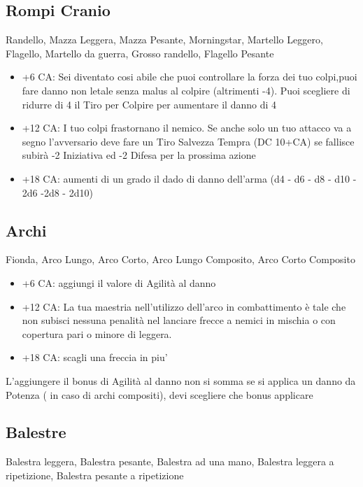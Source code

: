 \documentclass[a4paper,11pt,twoside,openany]{book}
\begin{document}
\subsection{Rompi Cranio} Randello, Mazza Leggera, Mazza Pesante, Morningstar,
Martello Leggero, Flagello, Martello da guerra, Grosso randello, Flagello Pesante

\begin{itemize}
	\item +6 CA: Sei diventato cosi abile che puoi controllare la forza dei tuo colpi,puoi fare danno non letale senza malus al colpire (altrimenti -4). Puoi scegliere di ridurre di 4 il Tiro per Colpire per aumentare il danno di 4

	\item +12 CA: I tuo colpi frastornano il nemico. Se anche solo un tuo attacco va a segno l'avversario deve fare un Tiro Salvezza Tempra (DC 10+CA) se fallisce subirà -2 Iniziativa ed -2 Difesa per la prossima azione

	\item +18 CA: aumenti di un grado il dado di danno dell'arma (d4 - d6 - d8 - d10 - 2d6 -2d8 - 2d10)
\end{itemize}

\subsection{Archi} Fionda, Arco Lungo, Arco Corto, Arco Lungo Composito, Arco Corto Composito

\begin{itemize}

	\item +6 CA: aggiungi il valore di Agilità al danno

	\item +12 CA: La tua maestria nell'utilizzo dell'arco in combattimento è tale che non subisci nessuna penalità nel lanciare frecce a nemici in mischia o con copertura pari o minore di leggera.

	\item +18 CA: scagli una freccia in piu'

\end{itemize}

L'aggiungere il bonus di Agilità al danno non si somma se si applica un danno da Potenza ( in caso di archi compositi), devi scegliere che bonus applicare

\subsection{Balestre}Balestra leggera, Balestra pesante, Balestra ad una mano, Balestra leggera a ripetizione, Balestra pesante a ripetizione
\end{document}
